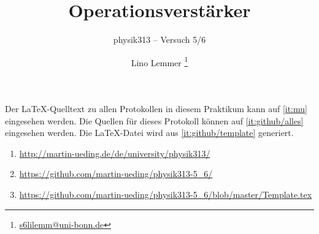 


\usepackage{placeins}



\subject{Praktikumsprotokoll}
\title{Operationsverstärker}
\subtitle{physik313 – Versuch 5/6}
\author{
	Lino Lemmer
    \footnote{\href{mailto:s6lilemm@uni-bonn.de}{s6lilemm@uni-bonn.de}}
}


\newcommand\fT{f_\text{T}}
\newcommand\IB{I_\text{B}}
\newcommand\IC{I_\text{C}}
\newcommand\ID{I_\text{D}}
\newcommand\IE{I_\text{E}}
\newcommand\IS{I_\text{S}}
\newcommand\RC{R_\text{C}}
\newcommand\RD{R_\text{D}}
\newcommand\RE{R_\text{E}}
\newcommand\UBE{U_\text{BE}}
\newcommand\UB{U_\text{B}}
\newcommand\UCE{U_\text{CE}}
\newcommand\UC{U_\text{C}}
\newcommand\UD{U_\text{D}}
\newcommand\UDS{U_\text{DS}}
\newcommand\UE{U_\text{E}}
\newcommand\UGS{U_\text{GS}}
\newcommand\UG{U_\text{G}}
\newcommand\Uin{U_\text{in}}
\newcommand\Uout{U_\text{out}}



\maketitle

Der \LaTeX-Quelltext zu allen Protokollen in diesem Praktikum kann auf
\ref{it:mu} eingesehen werden. Die Quellen für dieses Protokoll können auf
\ref{it:github/alles} eingesehen werden. Die \LaTeX-Datei wird aus
\ref{it:github/template} generiert.

\begin{enumerate}
	\item
		\label{it:mu}
		\url{http://martin-ueding.de/de/university/physik313/}
	\item
		\label{it:github/alles}
		\url{https://github.com/martin-ueding/physik313-5_6/}
	\item
		\label{it:github/template}
		\url{https://github.com/martin-ueding/physik313-5_6/blob/master/Template.tex}
\end{enumerate}

\tableofcontents
\newpage


